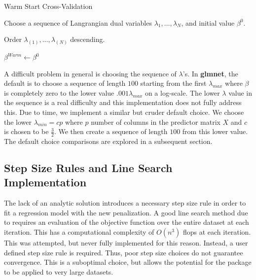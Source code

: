 \documentclass[article]{jss}
\numberwithin{equation}{section}
\begin{document}
\vspace{.2cm}
\begin{algorithm}[H]
\caption{Warm Start Cross-Validation}
Choose a sequence of Langrangian dual variables $\lambda_1, \ldots, \lambda_N$, and initial value $\beta^0$.

Order $\lambda_{(1)}, \ldots, \lambda_{(N)}$ descending.

$\beta^{Warm} \gets \beta^0$ 


\end{algorithm}
\vspace{.2cm}

A difficult problem in general is choosing the sequence of $\lambda$'s.
In \textbf{glmnet}, the default is to choose a sequence of length $100$ starting from the first $\lambda_{max}$ where $\beta$ is completely zero to the lower value $.001 \lambda_{max}$ on a log-scale.
The lower $\lambda$ value in the sequence is a real difficulty and this implementation does not fully address this.
Due to time, we implement a similar but cruder default choice.
We choose the lower $\lambda_{min} = cp$ where $p$ number of columns in the predictor matrix $X$ and $c$ is chosen to be $\frac{3}{2}$. We then create a sequence of length $100$ from this lower value.
The default choice comparisons are explored in a subsequent section.

\subsection{Step Size Rules and Line Search Implementation}

The lack of an analytic solution introduces a necessary step size rule in order to fit a regression model with the new penalization.
A good line search method due to \cite{beck_teboulle} requires an evaluation of the objective function over the entire dataset at each iteration. This has a computational complexity of $O(n^3)$ flops at each iteration. This was attempted, but never fully implemented for this reason. Instead, a user defined step size rule is required. Thus, poor step size choices do not guarantee convergence.
This is a suboptimal choice, but allows the potential for the package to be applied to very large datasets.
\end{document}
